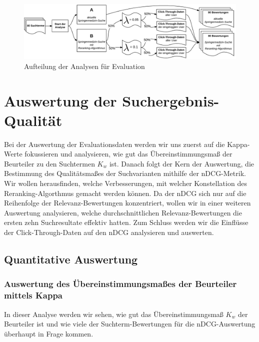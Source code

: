 \begin{figure}[H]
\centering
\vspace{-.5em}
\caption[Aufteilung der Analysen für Evaluation]{Aufteilung der Analysen für Evaluation}
\vspace{.5em}
\label{fig:AufteilungAnalysenEvaluation}
\includegraphics[width=0.9\linewidth]{gfx/EvaluationsvariantenRerankingSuche}
\vspace{-2em}
\end{figure}

\section{Auswertung der Suchergebnis-Qualität}
\label{sec:Evaluation:Auswertung}

Bei der Auswertung der Evaluationsdaten werden wir uns zuerst auf die Kappa-Werte fokussieren und analysieren, wie gut das Übereinstimmungsmaß der Beurteiler zu den Suchtermen $K_w$ ist. Danach folgt der Kern der Auswertung, die Bestimmung des Qualitätsmaßes der Suchvarianten mithilfe der nDCG-Metrik. Wir wollen herausfinden, welche Verbesserungen, mit welcher Konstellation des Reranking-Algorthmus gemacht werden können. Da der nDCG sich nur auf die Reihenfolge der Relevanz-Bewertungen konzentriert, wollen wir in einer weiteren Auswertung analysieren, welche durchschnittlichen Relevanz-Bewertungen die ersten zehn Suchresultate effektiv hatten. Zum Schluss werden wir die Einflüsse der Click-Through-Daten auf den nDCG analysieren und auswerten.

\subsection{Quantitative Auswertung}
\label{sec:Evaluation:Auswertung:QuantitativeAuswertung}

\subsubsection{Auswertung des Übereinstimmungsmaßes der Beurteiler mittels Kappa}
\label{sec:Evaluation:Auswertung:QuantitativeAuswertung:Kappa}

In dieser Analyse werden wir sehen, wie gut das Übereinstimmungsmaß $K_w$ der Beurteiler ist und wie viele der Suchterm-Bewertungen für die nDCG-Auswertung überhaupt in Frage kommen. 

